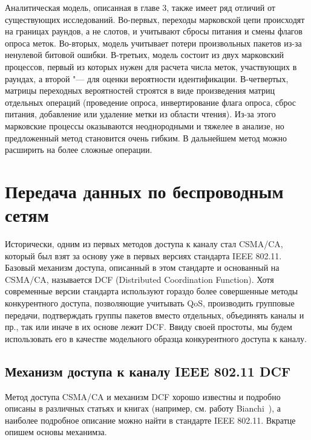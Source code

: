 Аналитическая модель, описанная в главе 3, также имеет ряд отличий от существующих исследований. Во-первых, переходы марковской цепи происходят на границах раундов, а не слотов, и учитывают сбросы питания и смены флагов опроса меток. Во-вторых, модель учитывает потери произвольных пакетов из-за ненулевой битовой ошибки. В-третьих, модель состоит из двух марковский процессов, первый из которых нужен для расчета числа меток, участвующих в раундах, а второй "--- для оценки вероятности идентификации. В-четвертых, матрицы переходных вероятностей строятся в виде произведения матриц отдельных операций (проведение опроса, инвертирование флага опроса, сброс питания, добавление или удаление метки из области чтения). Из-за этого марковские процессы оказываются неоднородными и тяжелее в анализе, но предложенный метод становится очень гибким. В дальнейшем метод можно расширить на более сложные операции.




\section{Передача данных по беспроводным сетям}\label{sec:ch1_wifi}

Исторически, одним из первых методов доступа к каналу стал CSMA/CA, который был взят за основу уже в первых версиях стандарта IEEE 802.11. Базовый механизм доступа, описанный в этом стандарте и основанный на CSMA/CA, называется DCF (Distributed Coordination Function). Хотя современные версии стандарта используют гораздо более совершенные методы конкурентного доступа, позволяющие учитывать QoS, производить групповые передачи, подтверждать группы пакетов вместо отдельных, объединять каналы и пр., так или иначе в их основе лежит DCF. Ввиду своей простоты, мы будем использовать его в качестве модельного образца конкурентного доступа к каналу.


\subsection{Механизм доступа к каналу IEEE 802.11 DCF}\label{sec:ch1_wifi_dcf}

Метод доступа CSMA/CA и механизм DCF хорошо известны и подробно описаны в различных статьях и книгах (например, см. работу Bianchi~\cite{Bianchi2000}), а наиболее подробное описание можно найти в стандарте IEEE 802.11. Вкратце опишем основы механимза.


